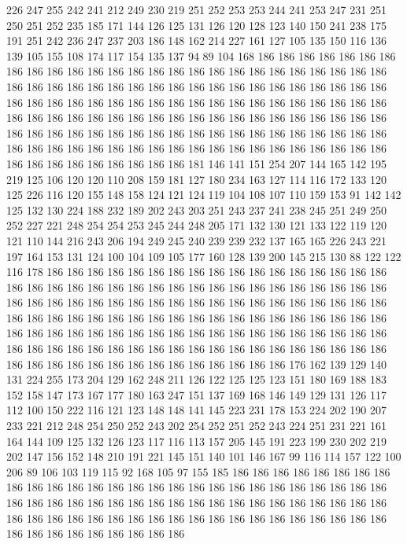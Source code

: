 226 247 255 242 241 212 249 230 219 251 252 253 253 244 241 253 247 231 251 250
251 252 235 185 171 144 126 125 131 126 120 128 123 140 150 241 238 175 191 251
242 236 247 237 203 186 148 162 214 227 161 127 105 135 150 116 136 139 105 155
108 174 117 154 135 137 94 89 104 168 186 186 186 186 186 186 186 186 186 186
186 186 186 186 186 186 186 186 186 186 186 186 186 186 186 186 186 186 186 186
186 186 186 186 186 186 186 186 186 186 186 186 186 186 186 186 186 186 186 186
186 186 186 186 186 186 186 186 186 186 186 186 186 186 186 186 186 186 186 186
186 186 186 186 186 186 186 186 186 186 186 186 186 186 186 186 186 186 186 186
186 186 186 186 186 186 186 186 186 186 186 186 186 186 186 186 186 186 186 186
186 186 186 186 186 186 186 186 186 186 186 186 186 186 186 186 186 186 186 186
181 146 141 151 254 207 144 165 142 195 219 125 106 120 120 110 208 159 181 127
180 234 163 127 114 116 172 133 120 125 226 116 120 155 148 158 124 121 124 119
104 108 107 110 159 153 91 142 142 125 132 130 224 188 232 189 202 243 203 251
243 237 241 238 245 251 249 250 252 227 221 248 254 254 253 245 244 248 205 171
132 130 121 133 122 119 120 121 110 144 216 243 206 194 249 245 240 239 239 232
137 165 165 226 243 221 197 164 153 131 124 100 104 109 105 177 160 128 139 200
145 215 130 88 122 122 116 178 186 186 186 186 186 186 186 186 186 186 186 186
186 186 186 186 186 186 186 186 186 186 186 186 186 186 186 186 186 186 186 186
186 186 186 186 186 186 186 186 186 186 186 186 186 186 186 186 186 186 186 186
186 186 186 186 186 186 186 186 186 186 186 186 186 186 186 186 186 186 186 186
186 186 186 186 186 186 186 186 186 186 186 186 186 186 186 186 186 186 186 186
186 186 186 186 186 186 186 186 186 186 186 186 186 186 186 186 186 186 186 186
186 186 186 186 186 186 186 186 186 186 186 186 186 186 176 162 139 129 140 131
224 255 173 204 129 162 248 211 126 122 125 125 123 151 180 169 188 183 152 158
147 173 167 177 180 163 247 151 137 169 168 146 149 129 131 126 117 112 100 150
222 116 121 123 148 148 141 145 223 231 178 153 224 202 190 207 233 221 212 248
254 250 252 243 202 254 252 251 252 243 224 251 231 221 161 164 144 109 125 132
126 123 117 116 113 157 205 145 191 223 199 230 202 219 202 147 156 152 148 210
191 221 145 151 140 101 146 167 99 116 114 157 122 100 206 89 106 103 119 115
92 168 105 97 155 185 186 186 186 186 186 186 186 186 186 186 186 186 186 186
186 186 186 186 186 186 186 186 186 186 186 186 186 186 186 186 186 186 186 186
186 186 186 186 186 186 186 186 186 186 186 186 186 186 186 186 186 186 186 186
186 186 186 186 186 186 186 186 186 186 186 186 186 186 186 186 186 186 186 186
